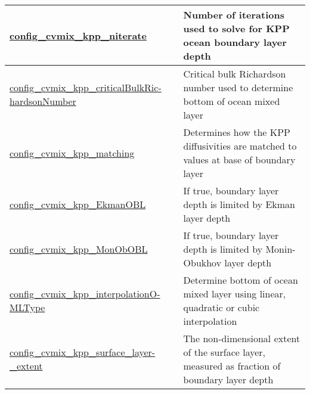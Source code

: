 {\begin{center}
\begin{longtable}{| p{2.0in} || p{4.0in} |}
	\hline
	\hyperref[sec:nm_sec_config_cvmix_kpp_niterate]{config\_cvmix\_kpp\_niterate} & Number of iterations used to solve for KPP ocean boundary layer depth \\
	\hline
	\hyperref[sec:nm_sec_config_cvmix_kpp_criticalBulkRichardsonNumber]{config\_cvmix\_kpp\_criticalBulkRic-}\hyperref[sec:nm_sec_config_cvmix_kpp_criticalBulkRichardsonNumber]{hardsonNumber}& Critical bulk Richardson number used to determine bottom of ocean mixed layer \\
	\hline
	\hyperref[sec:nm_sec_config_cvmix_kpp_matching]{config\_cvmix\_kpp\_matching} & Determines how the KPP diffusivities are matched to values at base of boundary layer \\
	\hline
	\hyperref[sec:nm_sec_config_cvmix_kpp_EkmanOBL]{config\_cvmix\_kpp\_EkmanOBL} & If true, boundary layer depth is limited by Ekman layer depth \\
	\hline
	\hyperref[sec:nm_sec_config_cvmix_kpp_MonObOBL]{config\_cvmix\_kpp\_MonObOBL} & If true, boundary layer depth is limited by Monin-Obukhov layer depth \\
	\hline
	\hyperref[sec:nm_sec_config_cvmix_kpp_interpolationOMLType]{config\_cvmix\_kpp\_interpolationO-}\hyperref[sec:nm_sec_config_cvmix_kpp_interpolationOMLType]{MLType}& Determine bottom of ocean mixed layer using linear, quadratic or cubic interpolation \\
	\hline
	\hyperref[sec:nm_sec_config_cvmix_kpp_surface_layer_extent]{config\_cvmix\_kpp\_surface\_layer-}\hyperref[sec:nm_sec_config_cvmix_kpp_surface_layer_extent]{\_extent}& The non-dimensional extent of the surface layer, measured as fraction of boundary layer depth \\
	\hline
\end{longtable}
\end{center}
}
